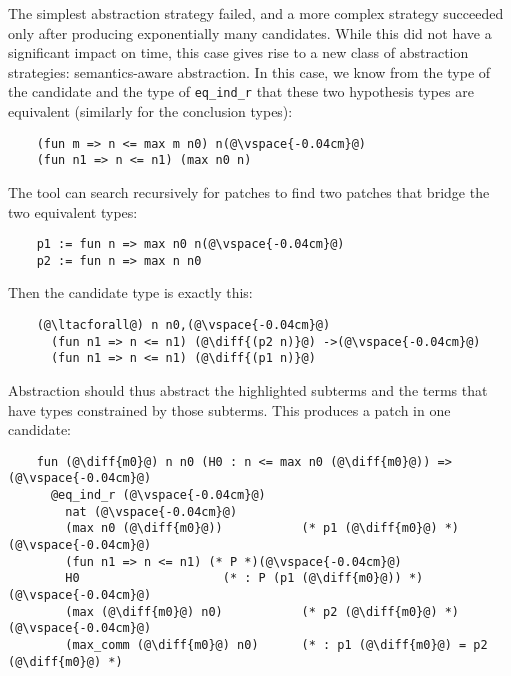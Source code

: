 The simplest abstraction strategy failed, and a more
complex strategy
succeeded only after producing exponentially many candidates.
While this did not have a significant impact on time,
this case gives rise to a new class of abstraction strategies:
semantics-aware abstraction.
In this case, we know from the type of the candidate
and the type of \lstinline{eq_ind_r} that these two hypothesis types 
are equivalent (similarly for the conclusion types):

\begin{lstlisting}
    (fun m => n <= max m n0) n(@\vspace{-0.04cm}@)
    (fun n1 => n <= n1) (max n0 n)
\end{lstlisting}

The tool can search recursively for patches to find two patches that bridge the two equivalent
types:

\begin{lstlisting}
    p1 := fun n => max n0 n(@\vspace{-0.04cm}@)
    p2 := fun n => max n n0
\end{lstlisting}

Then the candidate type is exactly this:

\begin{lstlisting}
    (@\ltacforall@) n n0,(@\vspace{-0.04cm}@)
      (fun n1 => n <= n1) (@\diff{(p2 n)}@) ->(@\vspace{-0.04cm}@)
      (fun n1 => n <= n1) (@\diff{(p1 n)}@)
\end{lstlisting}

Abstraction should thus abstract the highlighted subterms and the
terms that have types constrained by those subterms.
This produces a patch in one candidate:

\begin{lstlisting}
    fun (@\diff{m0}@) n n0 (H0 : n <= max n0 (@\diff{m0}@)) =>(@\vspace{-0.04cm}@)
      @eq_ind_r (@\vspace{-0.04cm}@)
        nat (@\vspace{-0.04cm}@)
        (max n0 (@\diff{m0}@))           (* p1 (@\diff{m0}@) *)(@\vspace{-0.04cm}@)
        (fun n1 => n <= n1) (* P *)(@\vspace{-0.04cm}@)
        H0                    (* : P (p1 (@\diff{m0}@)) *)(@\vspace{-0.04cm}@)
        (max (@\diff{m0}@) n0)           (* p2 (@\diff{m0}@) *)(@\vspace{-0.04cm}@)
        (max_comm (@\diff{m0}@) n0)      (* : p1 (@\diff{m0}@) = p2 (@\diff{m0}@) *)
\end{lstlisting}

